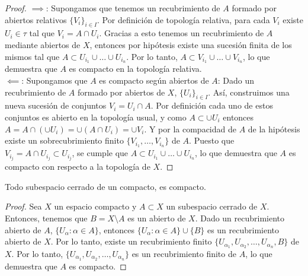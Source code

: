 \begin{proof}
    $\implies$: Supongamos que tenemos un recubrimiento de $A$ formado por abiertos relativos $\{V_i\}_{i \in I}$. Por definición de topología relativa, para cada $V_i$ existe $U_i \in \tau$ tal que $V_i = A \cap U_i$. Gracias a esto tenemos un recubrimiento de $A$ mediante abiertos de $X$, entonces por hipótesis existe una sucesión finita de los mismos tal que $A \subset U_{i_1} \cup \ldots \cup U_{i_n}$. Por lo tanto, $A \subset V_{i_1} \cup \ldots \cup V_{i_n}$, lo que demuestra que $A$ es compacto en la topología relativa. \\
    $\impliedby$: Supongamos que $A$ es compacto según abiertos de $A$: Dado un recubrimiento de $A$ formado por abiertos de $X$, $\{U_i\}_{i \in I}$. Así, construimos una nueva sucesión de conjuntos $V_i = U_i \cap A$. Por definición cada uno de estos conjuntos es abierto en la topología usual, y como $A \subset \cup U_i$ entonces $A = A \cap (\cup U_i) = \cup (A \cap U_i) = \cup V_i$. Y por la compacidad de $A$ de la hipótesis existe un sobrecubrimiento finito $\{V_{i_1}, \ldots, V_{i_n}\}$ de $A$. Puesto que $V_{i_j} = A \cap U_{i_j} \subset U_{i_j}$, se cumple que $A \subset U_{i_1} \cup \ldots \cup U_{i_n}$, lo que demuestra que $A$ es compacto con respecto a la topología de $X$.
\end{proof}
\begin{proposición}
    Todo subespacio cerrado de un compacto, es compacto. 
\end{proposición}
\begin{proof}
    Sea $X$ un espacio compacto y $A \subset X$ un subespacio cerrado de $X$. Entonces, tenemos que $B = X \setminus A$ es un abierto de $X$. Dado un recubrimiento abierto de $A$, $\{U_{\alpha} : \alpha \in A\}$, entonces $\{U_{\alpha} : \alpha \in A\} \cup \{B\}$ es un recubrimiento abierto de $X$. Por lo tanto, existe un recubrimiento finito $\{U_{\alpha_1}, U_{\alpha_2}, \ldots, U_{\alpha_n}, B\}$ de $X$. Por lo tanto, $\{U_{\alpha_1}, U_{\alpha_2}, \ldots, U_{\alpha_n}\}$ es un recubrimiento finito de $A$, lo que demuestra que $A$ es compacto.
\end{proof}
